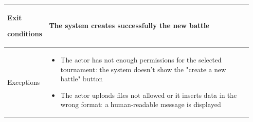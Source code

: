 \begin{center}
\begin{tabular}{| m{2cm} | m{10cm}|}
        Exit \par conditions  & The system creates successfully the new battle                                                                                  \\ \hline
        Exceptions            & \begin{itemize}
                                    \item The actor has not enough permissions for the selected tournament: the system doesn't show the "create a new battle" button
                                    \item The actor uploads files not allowed or it inserts data in the wrong format: a human-readable message is displayed
                                \end{itemize} \\ \hline
    \end{tabular}
\end{center}
